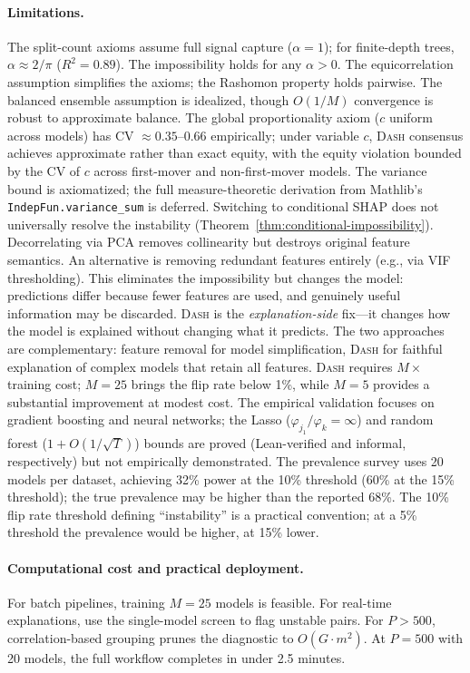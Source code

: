 \documentclass{jmlr}
\newcommand{\DASH}{\textsc{Dash}}
\begin{document}
\paragraph{Limitations.}
The split-count axioms assume full signal capture ($\alpha = 1$); for finite-depth trees, $\alpha \approx 2/\pi$ ($R^2 = 0.89$). The impossibility holds for any $\alpha > 0$.
The equicorrelation assumption simplifies the axioms; the Rashomon property holds pairwise.
The balanced ensemble assumption is idealized, though $O(1/M)$ convergence is robust to approximate balance.
The global proportionality axiom ($c$ uniform across models) has CV $\approx 0.35$--$0.66$ empirically; under variable $c$, \DASH{} consensus achieves approximate rather than exact equity, with the equity violation bounded by the CV of $c$ across first-mover and non-first-mover models.
The variance bound is axiomatized; the full measure-theoretic derivation from Mathlib's \texttt{IndepFun.variance\_sum} is deferred.
Switching to conditional SHAP does not universally resolve the instability (Theorem~\ref{thm:conditional-impossibility}).
Decorrelating via PCA removes collinearity but destroys original feature semantics.
An alternative is removing redundant features entirely (e.g., via VIF thresholding). This eliminates the impossibility but changes the model: predictions differ because fewer features are used, and genuinely useful information may be discarded. \DASH{} is the \emph{explanation-side} fix---it changes how the model is explained without changing what it predicts. The two approaches are complementary: feature removal for model simplification, \DASH{} for faithful explanation of complex models that retain all features.
\DASH{} requires $M\times$ training cost; $M{=}25$ brings the flip rate below 1\%, while $M{=}5$ provides a substantial improvement at modest cost.
The empirical validation focuses on gradient boosting and neural networks; the Lasso ($\varphi_{j_1}/\varphi_k = \infty$) and random forest ($1 + O(1/\sqrt{T})$) bounds are proved (Lean-verified and informal, respectively) but not empirically demonstrated.
The prevalence survey uses 20 models per dataset, achieving 32\% power at the 10\% threshold (60\% at the 15\% threshold); the true prevalence may be higher than the reported 68\%.
The 10\% flip rate threshold defining ``instability'' is a practical convention; at a 5\% threshold the prevalence would be higher, at 15\% lower.

\paragraph{Computational cost and practical deployment.}
For batch pipelines, training $M{=}25$ models is feasible. For real-time explanations, use the single-model screen to flag unstable pairs. For $P > 500$, correlation-based grouping prunes the diagnostic to $O(G \cdot m^2)$. At $P{=}500$ with 20 models, the full workflow completes in under 2.5 minutes.
\end{document}
